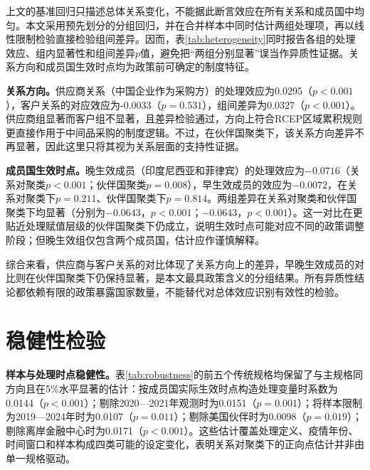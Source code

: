 \documentclass[12pt,a4paper]{ctexart}
\begin{document}
上文的基准回归只描述总体关系变化，不能据此断言效应在所有关系和成员国中均匀。本文采用预先划分的分组回归，并在合并样本中同时估计两组处理项，再以线性限制检验直接检验组间差异。因而，表\ref{tab:heterogeneity}同时报告各组的处理效应、组内显著性和组间差异$p$值，避免把“两组分别显著”误当作异质性证据。关系方向和成员国生效时点均为政策前可确定的制度特征。


\textbf{关系方向。}供应商关系（中国企业作为采购方）的处理效应为0.0295（$p<0.001$），客户关系的对应效应为-0.0033（$p=0.531$），组间差异为0.0327（$p<0.001$）。供应商组显著而客户组不显著，且差异检验通过，方向上符合RCEP区域累积规则更直接作用于中间品采购的制度逻辑。不过，在伙伴国聚类下，该关系方向差异不再显著，因此这里只将其视为关系层面的支持性证据。

\textbf{成员国生效时点。}晚生效成员（印度尼西亚和菲律宾）的处理效应为$-0.0716$（关系对聚类$p<0.001$；伙伴国聚类$p=0.008$），早生效成员的效应为$-0.0072$，在关系对聚类下$p=0.211$、伙伴国聚类下$p=0.814$。两组差异在关系对聚类和伙伴国聚类下均显著（分别为$-0.0643$，$p<0.001$；$-0.0643$，$p<0.001$）。这一对比在更贴近处理赋值层级的伙伴国聚类下仍成立，说明生效时点可能对应不同的政策调整阶段；但晚生效组仅包含两个成员国，估计应作谨慎解释。

综合来看，供应商与客户关系的对比体现了关系方向上的差异，早晚生效成员的对比则在伙伴国聚类下仍保持显著，是本文最具政策含义的分组结果。所有异质性结论都依赖有限的政策暴露国家数量，不能替代对总体效应识别有效性的检验。


\section{稳健性检验}


\textbf{样本与处理时点稳健性。}表\ref{tab:robustness}的前五个传统规格均保留了与主规格同方向且在5\%水平显著的估计：按成员国实际生效时点构造处理变量时系数为0.0144（$p<0.001$）；剔除2020—2021年观测时为0.0151（$p=0.001$）；将样本限制为2019—2024年时为0.0107（$p=0.011$）；剔除美国伙伴时为0.0098（$p=0.019$）；剔除离岸金融中心时为0.0171（$p<0.001$）。这些估计覆盖处理定义、疫情年份、时间窗口和样本构成四类可能的设定变化，表明关系对聚类下的正向点估计并非由单一规格驱动。
\end{document}
